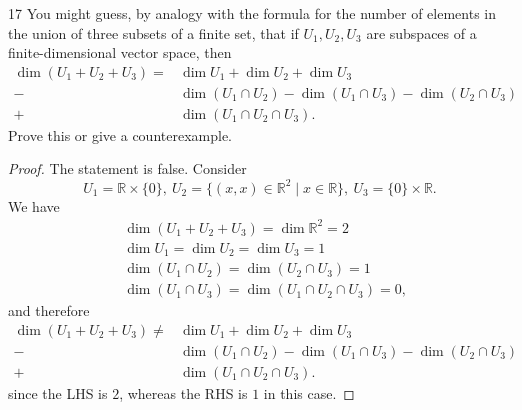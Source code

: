 \documentclass{extarticle}
\newenvironment{problem}[1]{\begin{prob*}{#1}{}}{\end{prob*}}
\newcommand{\R}{\mathbb{R}}
\begin{document}
\begin{problem}{17}
You might guess, by analogy with the formula for the number of elements in the union of three subsets of a finite set, that if $U_1,U_2,U_3$ are subspaces of a finite-dimensional vector space, then
\begin{align*}
\dim(U_1+ U_2 + U_3) = &\dim U_1 + \dim U_2 + \dim U_3\\
 			              -&\dim(U_1\cap U_2) - \dim(U_1\cap U_3) - \dim(U_2\cap U_3)\\
			               + &\dim(U_1\cap U_2 \cap U_3).
\end{align*}
Prove this or give a counterexample.
\end{problem}
\begin{proof}
The statement is false.  Consider
\begin{equation*}
U_1 = \R \times\{0\}, ~ U_2 = \{(x, x)\in\R^2\mid x\in\R\}, ~ U_3 = \{0\}\times\R.
\end{equation*}
We have
\begin{align*}
&\dim(U_1 + U_2 + U_3) = \dim\R^2 = 2\\
&\dim U_1 = \dim U_2 = \dim U_3 = 1\\
&\dim(U_1\cap U_2) = \dim(U_2\cap U_3) = 1\\
&\dim(U_1\cap U_3) = \dim(U_1\cap U_2\cap U_3) = 0,
\end{align*}
and therefore 
\begin{align*}
\dim(U_1+ U_2 + U_3) \neq &\dim U_1 + \dim U_2 + \dim U_3\\
 			              -&\dim(U_1\cap U_2) - \dim(U_1\cap U_3) - \dim(U_2\cap U_3)\\
			               + &\dim(U_1\cap U_2 \cap U_3).
\end{align*}
since the LHS is $2$, whereas the RHS is $1$ in this case.
\end{proof}
\end{document}
